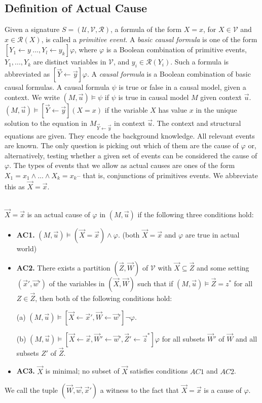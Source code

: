 \documentclass{article}
\begin{document}
\subsection{Definition of Actual Cause}
Given a signature $S= (\mathcal{U},\mathcal{V},\mathcal{R})$, a formula of the form $X =x$, for $X \in \mathcal{V}$ and $x \in \mathcal{R}(X)$, is called a \textit{primitive event}.
A \textit{basic causal formula} is one of the form $[Y_1 \leftarrow y_, ..., Y_l\leftarrow y_k]\varphi$, where $\varphi$ is a Boolean combination of primitive events, $Y_1,...,Y_k$ are distinct variables in $\mathcal{V}$, and $y_i \in \mathcal{R}(Y_i)$.
Such a formula is abbreviated as $[\vec{Y}\leftarrow\vec{y}]\varphi$.
A \textit{causal formula} is a Boolean combination of basic causal formulas.
A causal formula $\psi$ is true or false in a causal model, given a context.
We write $(M,\vec u)\models \psi$ if $\psi$ is true in causal model $M$ given context $\vec u$.
$(M,\vec u)\models [\vec Y\leftarrow \vec y](X=x)$ if the variable $X$ has value $x$ in the unique solution to the equation in $M_{\vec{Y} \leftarrow \vec{y}}$ in context $\vec u$.
The context and structural equations are given.
They encode the background knowledge.
All relevant events are known.
The only question is picking out which of them are the cause of $\varphi$ or, alternatively, testing whether a given set of events can be considered the cause of $\varphi$.
The types of events that we allow as actual causes are ones of the form $X_1 = x_1 \wedge ... \wedge X_k=x_k$-- that is, conjunctions of primitives events.
We abbreviate this as $\vec X = \vec x$.
\\
\\
\begin{definition}

    $\vec X = \vec x$ is an actual cause of $\varphi$ in $(M,\vec u)$ if the following three conditions hold:
    \begin{itemize}
        \item  \textbf{AC1.} $(M,\vec u)\models (\vec X = \vec x) \wedge \varphi$.
              (both $\vec X = \vec x$ and $\varphi$ are true in actual world)
        \item  \textbf{AC2. }There exists a partition $(\vec Z, \vec W)$ of $\mathcal{V}$ with $\vec X \subseteq \vec Z$ and some setting $(\vec x',\vec w')$ of the variables in $(\vec X,\vec W)$ such that if $(M,\vec u)\models \vec Z = z^*$ for all $Z\in \vec Z$, then both of the following conditions hold:

              (a) $(M,\vec u)\models[\vec X \leftarrow \vec x', \vec W \leftarrow \vec w']\neg \varphi$.

              (b) $(M,\vec u)\models[\vec X\leftarrow \vec x, \vec W' \leftarrow \vec w', \vec Z'\leftarrow \vec z^*]\varphi$ for all subsets $\vec W'$ of $\vec W$ and all subsets $Z'$ of $\vec Z$.

        \item  \textbf{AC3.} $\vec X$ is minimal; no subset of $\vec X$ satisfies conditions $AC1$ and $AC2$.
    \end{itemize}
\end{definition}
We call the tuple $(\vec W, \vec w,\vec x')$ a witness to the fact that $\vec X=\vec x$ is a cause of $\varphi$.
\end{document}
